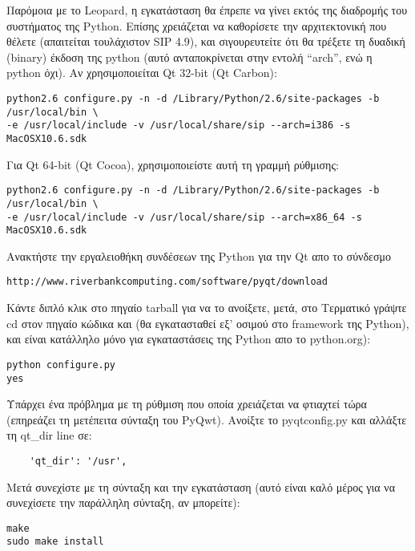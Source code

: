 Παρόμοια με το Leopard, η εγκατάσταση θα έπρεπε να γίνει εκτός της διαδρομής του συστήματος της Python. Επίσης χρειάζεται να καθορίσετε την αρχιτεκτονική που θέλετε (απαιτείται τουλάχιστον SIP 4.9), και σιγουρευτείτε ότι θα τρέξετε τη δυαδική (binary) έκδοση της python (αυτό ανταποκρίνεται στην εντολή “arch”, ενώ η python όχι). Αν χρησιμοποιείται Qt 32-bit (Qt Carbon):

\begin{verbatim}
python2.6 configure.py -n -d /Library/Python/2.6/site-packages -b /usr/local/bin \
-e /usr/local/include -v /usr/local/share/sip --arch=i386 -s MacOSX10.6.sdk
\end{verbatim}

Για Qt 64-bit (Qt Cocoa), χρησιμοποιείστε αυτή τη γραμμή ρύθμισης:

\begin{verbatim}
python2.6 configure.py -n -d /Library/Python/2.6/site-packages -b /usr/local/bin \
-e /usr/local/include -v /usr/local/share/sip --arch=x86_64 -s MacOSX10.6.sdk
\end{verbatim}

Ανακτήστε την εργαλειοθήκη συνδέσεων της Python για την Qt απο το σύνδεσμο

\begin{verbatim}
http://www.riverbankcomputing.com/software/pyqt/download
\end{verbatim}

Κάντε διπλό κλικ στο πηγαίο tarball για να το ανοίξετε, μετά, στο Τερματικό γράψτε cd στον πηγαίο κώδικα και (θα εγκατασταθεί εξ' οσιμού στο framework της Python), και είναι κατάλληλο μόνο για εγκαταστάσεις της Python απο το python.org):

\begin{verbatim}
python configure.py 
yes 
\end{verbatim}

Υπάρχει ένα πρόβλημα με τη ρύθμιση που οποία χρειάζεται να φτιαχτεί τώρα (επηρεάζει τη μετέπειτα σύνταξη του PyQwt).  Ανοίξτε το pyqtconfig.py
 και αλλάξτε τη qt\_dir line σε:

\begin{verbatim}
    'qt_dir': '/usr',
\end{verbatim}

Μετά συνεχίστε με τη σύνταξη και την εγκατάσταση (αυτό είναι καλό μέρος για να συνεχίσετε την παράλληλη σύνταξη, αν μπορείτε):

\begin{verbatim}
make 
sudo make install 
\end{verbatim}

